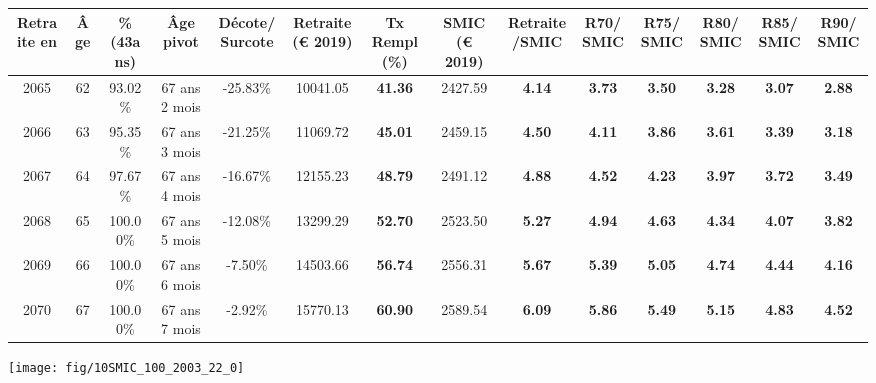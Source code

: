\begin{adjustbox}{max width=\textwidth} 
\begin{tabular}[htb]{|c|c||c|c|c||c|c||c|c||c|c|c|c|c|} 
\hline 
 Retraite en &  Âge &  \%(43ans) &  Âge pivot &  Décote/Surcote &  Retraite (\euro{} 2019) &  Tx Rempl(\%) &  SMIC (\euro{} 2019) &  Retraite/SMIC &  R70/SMIC &  R75/SMIC &  R80/SMIC &  R85/SMIC &  R90/SMIC \\ 
\hline \hline 
 2065 &  62 &  93.02\% &  67 ans 2 mois &  -25.83\% &  10041.05 &  {\bf 41.36} &  2427.59 &  {\bf 4.14} &  {\bf 3.73} &  {\bf 3.50} &  {\bf 3.28} &  {\bf 3.07} &  {\bf 2.88} \\ 
\hline 
 2066 &  63 &  95.35\% &  67 ans 3 mois &  -21.25\% &  11069.72 &  {\bf 45.01} &  2459.15 &  {\bf 4.50} &  {\bf 4.11} &  {\bf 3.86} &  {\bf 3.61} &  {\bf 3.39} &  {\bf 3.18} \\ 
\hline 
 2067 &  64 &  97.67\% &  67 ans 4 mois &  -16.67\% &  12155.23 &  {\bf 48.79} &  2491.12 &  {\bf 4.88} &  {\bf 4.52} &  {\bf 4.23} &  {\bf 3.97} &  {\bf 3.72} &  {\bf 3.49} \\ 
\hline 
 2068 &  65 &  100.00\% &  67 ans 5 mois &  -12.08\% &  13299.29 &  {\bf 52.70} &  2523.50 &  {\bf 5.27} &  {\bf 4.94} &  {\bf 4.63} &  {\bf 4.34} &  {\bf 4.07} &  {\bf 3.82} \\ 
\hline 
 2069 &  66 &  100.00\% &  67 ans 6 mois &  -7.50\% &  14503.66 &  {\bf 56.74} &  2556.31 &  {\bf 5.67} &  {\bf 5.39} &  {\bf 5.05} &  {\bf 4.74} &  {\bf 4.44} &  {\bf 4.16} \\ 
\hline 
 2070 &  67 &  100.00\% &  67 ans 7 mois &  -2.92\% &  15770.13 &  {\bf 60.90} &  2589.54 &  {\bf 6.09} &  {\bf 5.86} &  {\bf 5.49} &  {\bf 5.15} &  {\bf 4.83} &  {\bf 4.52} \\ 
\hline 
\hline 
\end{tabular} 
\end{adjustbox} 
 
 \vspace{0.1cm} 

 {\hspace{-2.2cm}\texttt{[image: fig/10SMIC\_100\_2003\_22\_0]}} 

\newpage 
 
